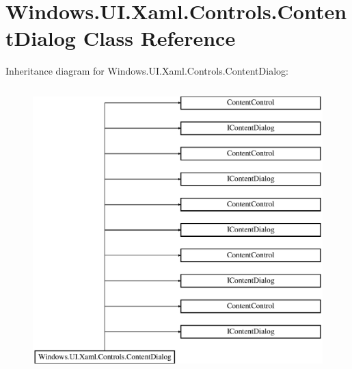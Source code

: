 \hypertarget{class_windows_1_1_u_i_1_1_xaml_1_1_controls_1_1_content_dialog}{}\section{Windows.\+U\+I.\+Xaml.\+Controls.\+Content\+Dialog Class Reference}
\label{class_windows_1_1_u_i_1_1_xaml_1_1_controls_1_1_content_dialog}
Inheritance diagram for Windows.\+U\+I.\+Xaml.\+Controls.\+Content\+Dialog\+:\begin{figure}[H]
\begin{center}
\leavevmode
\includegraphics[height=11.000000cm]{class_windows_1_1_u_i_1_1_xaml_1_1_controls_1_1_content_dialog}
\end{center}
\end{figure}
